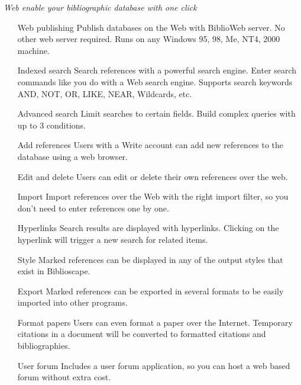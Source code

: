 \textit{Web enable your bibliographic database with one click}

\begin{itemize}

 \item[Web publishing] Publish databases on the Web with BiblioWeb
 server. No other web server required. Runs on any Windows 95, 98,
 Me, NT4, 2000 machine.

 \item[Indexed search] Search references with a powerful search engine.
 Enter search commands like you do with a Web search engine.
 Supports search keywords AND, NOT, OR, LIKE, NEAR, Wildcards,
 etc.

 \item[Advanced search] Limit searches to certain fields. Build complex
 queries with up to 3 conditions.

 \item[Add references] Users with a Write account can add new
 references to the database using a web browser.

 \item[Edit and delete] Users can edit or delete their own references over
 the web.

 \item[Import] Import references over the Web with the right import filter,
 so you don't need to enter references one by one.

 \item[Hyperlinks] Search results are displayed with hyperlinks. Clicking
 on the hyperlink will trigger a new search for related items.

 \item[Style] Marked references can be displayed in any of the output
 styles that exist in Biblioscape.

 \item[Export] Marked references can be exported in several formats to be
 easily imported into other programs.

 \item[Format papers] Users can even format a paper over the Internet.
 Temporary citations in a document will be converted to formatted
 citations and bibliographies.

 \item[User forum] Includes a user forum application, so you can host a
 web based forum without extra cost.


\end{itemize}

